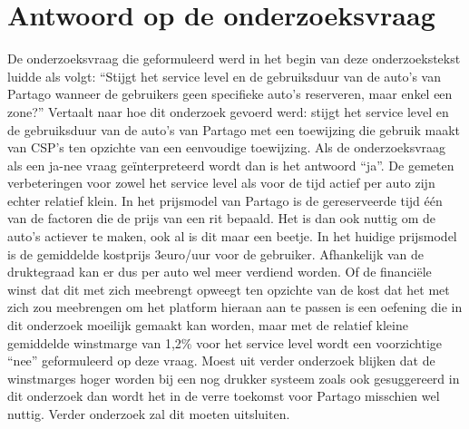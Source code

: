 \section{Antwoord op de onderzoeksvraag}
De onderzoeksvraag die geformuleerd werd in het begin van deze onderzoekstekst luidde als volgt: ``Stijgt het service level en de gebruiksduur van de auto's van Partago  wanneer de gebruikers geen specifieke auto's reserveren, maar enkel een zone?'' Vertaalt naar hoe dit onderzoek gevoerd werd: stijgt het service level en de gebruiksduur van de auto's van Partago met een toewijzing die gebruik maakt van CSP's ten opzichte van een eenvoudige toewijzing. Als de onderzoeksvraag als een ja-nee vraag geïnterpreteerd wordt dan is het antwoord ``ja''. De gemeten verbeteringen voor zowel het service level als voor de tijd actief per auto zijn echter relatief klein. In het prijsmodel van Partago is de gereserveerde tijd één van de factoren die de prijs van een rit bepaald. Het is dan ook nuttig om de auto's actiever te maken, ook al is dit maar een beetje. In het huidige prijsmodel is de gemiddelde kostprijs 3euro/uur voor de gebruiker. Afhankelijk van de druktegraad kan er dus per auto wel meer verdiend worden. Of de financiële winst dat dit met zich meebrengt opweegt ten opzichte van de kost dat het met zich zou meebrengen om het platform hieraan aan te passen is een oefening die in dit onderzoek moeilijk gemaakt kan worden, maar met de relatief kleine gemiddelde winstmarge van 1,2\% voor het service level wordt een voorzichtige ``nee'' geformuleerd op deze vraag. Moest uit verder onderzoek blijken dat de winstmarges hoger worden bij een nog drukker systeem zoals ook gesuggereerd in dit onderzoek dan wordt het in de verre toekomst voor Partago misschien wel nuttig. Verder onderzoek zal dit moeten uitsluiten.

